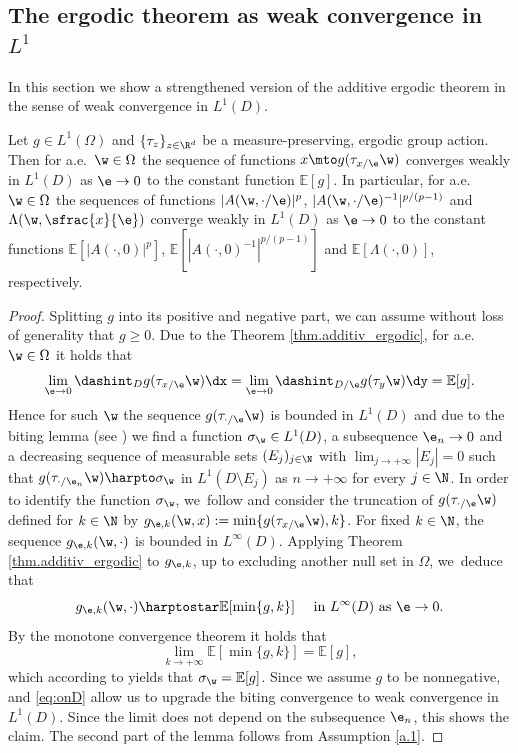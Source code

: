 \subsection{The ergodic theorem as weak convergence in \texorpdfstring{$L^1$}{}}
In this section we show a strengthened version of the additive ergodic theorem in the sense of weak convergence in $L^1(D)$.
\begin{lemma}\label{l.weakL1}
Let $g\in L^1(\Omega)$ and $\{\tau_z\}_{z\in\R^d}$ be a measure-preserving, ergodic group action. Then for a.e.\ $\w\in\Omega$ the sequence of functions $x\mto g(\tau_{x/\e}\w)$ converges weakly in $L^1(D)$ as $\e\to 0$ to the constant function $\mathbb{E}[g]$. In particular, for a.e.\ $\w\in\Omega$ the sequences of functions $|A(\w,\cdot/\e)|^p$, $|A(\w,\cdot/\e)^{-1}|^{p/(p-1)}$ and $\Lambda(\w,\sfrac{x}{\e})$ converge weakly in $L^1(D)$ as $\e\to 0$ to the constant functions $\mathbb{E}[|A(\cdot,0)|^p]$, $\mathbb{E}[|A(\cdot,0)^{-1}|^{p/(p-1)}]$ and $\mathbb{E}[\Lambda(\cdot,0)]$, respectively.
\end{lemma}
\begin{proof}
Splitting $g$ into its positive and negative part, we can assume without loss of generality that $g\geq 0$. Due to the Theorem \ref{thm.additiv_ergodic}, for a.e.\ $\w\in\Omega$ it holds that
\begin{equation}\label{eq:onD}
\lim_{\e\to 0}\dashint_Dg(\tau_{x/\e}\w)\dx=\lim_{\e\to 0}\dashint_{D/\e}g(\tau_y\w)\dy= \mathbb{E}[g].
\end{equation}
Hence for such $\w$ the sequence $g(\tau_{\cdot/\e}\w)$ is bounded in $L^1(D)$ and due to the biting lemma (see \cite{BaMu}) we find a function $\sigma_{\w}\in L^1(D)$, a subsequence $\e_n\to 0$ and a decreasing sequence of measurable sets $(E_j)_{j\in\N}$ with $\lim_{j\to +\infty}|E_j|=0$ such that $g(\tau_{\cdot/\e_n}\w)\harpto\nobreak \sigma_{\w}$ in $L^1(D\setminus E_j)$ as $n\to +\infty$ for every $j\in\N$. In order to identify the function $\sigma_{\w}$, we~follow \cite[\S 3]{BaMu} and consider the truncation of $g(\tau_{\cdot/\e}\w)$ defined for $k\in\N$ by $g_{\e,k}(\w,x):=\min\{g(\tau_{x/\e}\w),k\}$. For fixed $k\in\N$, the sequence $g_{\e,k}(\w,\cdot)$ is bounded in $L^{\infty}(D)$. Applying Theorem \ref{thm.additiv_ergodic} to $g_{\e,k}$, up to excluding another null set in $\Omega$, we~deduce that
\begin{equation*}
g_{\e,k}(\w,\cdot)\harptostar \mathbb{E}[\min\{g,k\}]\quad\text{ in }L^{\infty}(D)\text{ as }\e\to 0.
\end{equation*}
By the monotone convergence theorem it holds that
\begin{equation*}
\lim_{k\to +\infty}\mathbb{E}[\min\{g,k\}]=\mathbb{E}[g],
\end{equation*}
which according to \cite[Prop.\;on p.\,659]{BaMu} yields that $\sigma_{\w}=\mathbb{E}[g]$. Since we assume $g$ to be nonnegative, \cite[Prop.\,2.67]{FoLe} and \eqref{eq:onD} allow us to upgrade the biting convergence to weak convergence in $L^1(D)$. Since the limit does not depend on the subsequence $\e_n$, this shows the claim. The second part of the lemma follows from Assumption \ref{a.1}.
\end{proof}
